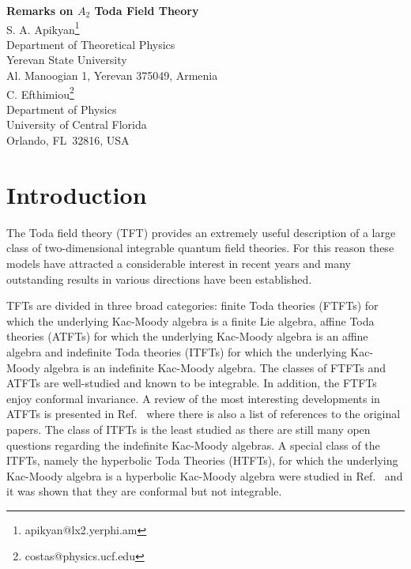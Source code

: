 \documentclass[a4paper,12pt]{article}
\begin{document}
\begin{center}
{\bfseries\Large Remarks on $A_2$ Toda Field Theory}\\[1cm]

S. A. Apikyan\footnote{apikyan@lx2.yerphi.am}\\
Department of Theoretical Physics\\
Yerevan State University\\
Al. Manoogian 1, Yerevan 375049, Armenia\\[1cm]

C. Efthimiou\footnote{costas@physics.ucf.edu}\\
Department of Physics\\
University of Central Florida\\
Orlando, FL~32816, USA
\end{center}


\begin{abstract}
We study the Toda field theory with finite Lie algebras using an
extension of the Goulian-Li
technique. In this way, we show that, after integrating over the zero mode in the
correlation functions of the exponential fields, 
the resulting correlation function resembles that of  a free theory. 
Furthermore, it
is shown that for some ratios of the charges of the exponential fields
the four-point correlation functions which contain a
degenerate field satisfy the Riemann ordinary differential
equation. Using this fact and the crossing symmetry, we derive a set
of functional equations for the structure constants of the $A_2$  Toda
field theory.
\end{abstract}

\section{Introduction}
The Toda field theory (TFT) provides an extremely useful description of
a large class of two-dimensional integrable quantum field
theories. For this reason  these models have attracted a considerable interest
in recent years and many outstanding results in various directions have been 
established.

TFTs are divided in three broad categories:
finite Toda theories (FTFTs) for which the underlying Kac-Moody
algebra \cite{Kac,GO} is a finite Lie algebra,
affine Toda theories (ATFTs) for which the underlying Kac-Moody
algebra is an affine  algebra and indefinite Toda theories
(ITFTs)  for which the underlying Kac-Moody 
algebra is an indefinite Kac-Moody 
algebra. 
The classes of FTFTs and ATFTs are well-studied and known to be
integrable. In addition, the FTFTs enjoy conformal invariance.
 A review of the most
interesting developments in ATFTs is presented in Ref.~\cite{Corrigan}
where there
is also a list of references to the original papers.
The class of ITFTs is the least studied as there are still many
open questions regarding the indefinite Kac-Moody algebras. A special
class of the ITFTs, namely the hyperbolic Toda Theories (HTFTs),
for which the underlying Kac-Moody algebra is a hyperbolic Kac-Moody
algebra were studied in Ref.~\cite{GIM} and it was shown that they are
conformal but not integrable.
\end{document}
